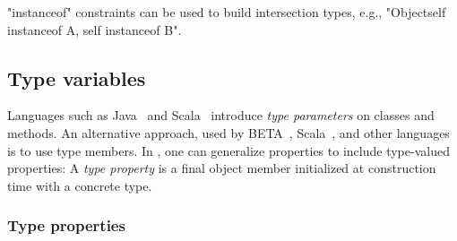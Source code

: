 \xcd"instanceof" constraints can be used to build intersection
types, e.g., \xcd"Object{self instanceof A, self instanceof B}".

\subsection{Type variables}
\label{sec:type-properties}
\label{sec:variance}

Languages such as Java~\cite{Java3} and
Scala~\cite{scala} introduce \emph{type parameters} on classes
and methods.
An alternative approach, used by BETA~\cite{beta}, 
Scala~\cite{scala}, and other languages is to use type members.
In \Xten, one can
generalize properties to include type-valued properties:
A \emph{type property}
is a final object member initialized at construction time with a
concrete type.  

\subsubsection{Type properties}

\label{sec:usability}
\label{sec:parameters-vs-fields}

